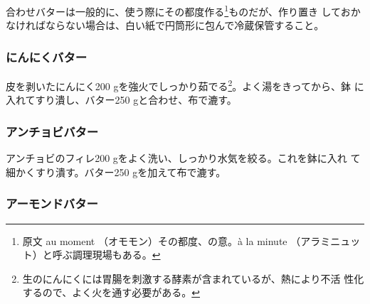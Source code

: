 合わせバターは一般的に、使う際にその都度作る\footnote{原文 au moment
  （オモモン）その都度、の意。à la minute （アラミニュッ
  ト）と呼ぶ調理現場もある。}ものだが、作り置き
しておかなければならない場合は、白い紙で円筒形に包んで冷蔵保管すること。
\begin{recette}
\hypertarget{beurre-d-ail}{%
\subsubsection{にんにくバター}\label{beurre-d-ail}}



皮を剥いたにんにく200 gを強火でしっかり茹でる\footnote{生のにんにくには胃腸を刺激する酵素が含まれているが、熱により不活
  性化するので、よく火を通す必要がある。}。よく湯をきってから、鉢
に入れてすり潰し、バター250 gと合わせ、布で漉す。

\maeaki

\hypertarget{beurre-d-anchois}{%
\subsubsection{アンチョビバター}\label{beurre-d-anchois}}



アンチョビのフィレ200 gをよく洗い、しっかり水気を絞る。これを鉢に入れ
て細かくすり潰す。バター250 gを加えて布で漉す。

\maeaki

\hypertarget{beurre-d-amande}{%
\subsubsection{アーモンドバター}\label{beurre-d-amande}}



\end{recette}
